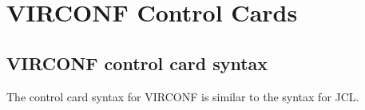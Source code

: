 \documentclass[letterpaper,10pt,english]{sphinxmanual}
\begin{document}
\ignorespaces 

\section{VIRCONF Control Cards}
\label{\detokenize{Installation_Guide:virconf-control-cards}}\label{\detokenize{Installation_Guide:index-161}}

\subsection{VIRCONF control card syntax}
\label{\detokenize{Installation_Guide:virconf-control-card-syntax}}
\sphinxAtStartPar
The control card syntax for VIRCONF is similar to the syntax for JCL.
\end{document}
